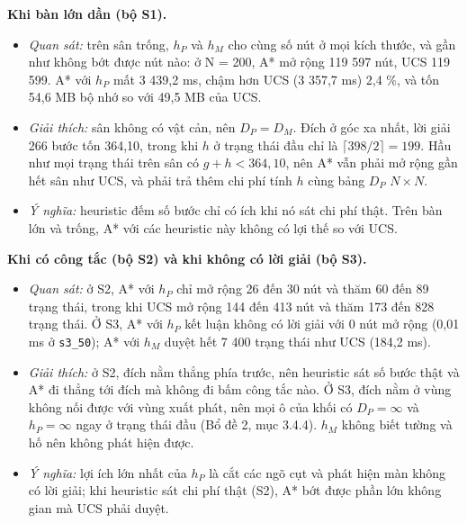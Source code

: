 \textbf{Khi bàn lớn dần (bộ S1).}

\begin{itemize}
\tightlist
\item
  \emph{Quan sát:} trên sân trống, \(h_P\) và \(h_M\) cho cùng số nút ở mọi kích thước, và gần như không bớt được nút nào: ở N = 200, A* mở rộng 119 597 nút, UCS 119 599. A* với \(h_P\) mất 3 439,2 ms, chậm hơn UCS (3 357,7 ms) 2,4 \%, và tốn 54,6 MB bộ nhớ so với 49,5 MB của UCS.
\item
  \emph{Giải thích:} sân không có vật cản, nên \(D_P = D_M\). Đích ở góc xa nhất, lời giải 266 bước tốn 364,10, trong khi \(h\) ở trạng thái đầu chỉ là \(\lceil 398/2 \rceil = 199\). Hầu như mọi trạng thái trên sân có \(g + h < 364{,}10\), nên A* vẫn phải mở rộng gần hết sân như UCS, và phải trả thêm chi phí tính \(h\) cùng bảng \(D_P\) \(N \times N\).
\item
  \emph{Ý nghĩa:} heuristic đếm số bước chỉ có ích khi nó sát chi phí thật. Trên bàn lớn và trống, A* với các heuristic này không có lợi thế so với UCS.
\end{itemize}

\textbf{Khi có công tắc (bộ S2) và khi không có lời giải (bộ S3).}

\begin{itemize}
\tightlist
\item
  \emph{Quan sát:} ở S2, A* với \(h_P\) chỉ mở rộng 26 đến 30 nút và thăm 60 đến 89 trạng thái, trong khi UCS mở rộng 144 đến 413 nút và thăm 173 đến 828 trạng thái. Ở S3, A* với \(h_P\) kết luận không có lời giải với 0 nút mở rộng (0,01 ms ở \texttt{s3\_\allowbreak{}50}); A* với \(h_M\) duyệt hết 7 400 trạng thái như UCS (184,2 ms).
\item
  \emph{Giải thích:} ở S2, đích nằm thẳng phía trước, nên heuristic sát số bước thật và A* đi thẳng tới đích mà không đi bấm công tắc nào. Ở S3, đích nằm ở vùng không nối được với vùng xuất phát, nên mọi ô của khối có \(D_P = \infty\) và \(h_P = \infty\) ngay ở trạng thái đầu (Bổ đề 2, mục 3.4.4). \(h_M\) không biết tường và hố nên không phát hiện được.
\item
  \emph{Ý nghĩa:} lợi ích lớn nhất của \(h_P\) là cắt các ngõ cụt và phát hiện màn không có lời giải; khi heuristic sát chi phí thật (S2), A* bớt được phần lớn không gian mà UCS phải duyệt.
\end{itemize}

